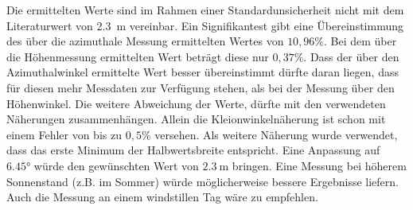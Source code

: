 \documentclass[../../main.tex]{subfiles}
\begin{document}
    Die ermittelten Werte sind im Rahmen einer Standardunsicherheit nicht mit dem Literaturwert von \SI{2,3}{\metre} \cite{doc:SalsaManual} vereinbar. Ein Signifikantest gibt eine Übereinstimmung des über die azimuthale Messung ermittelten Wertes von $10,96\%$. Bei dem über die Höhenmessung ermittelten Wert beträgt diese nur $0,37\%$. Dass der über den Azimuthalwinkel ermittelte Wert besser übereinstimmt dürfte daran liegen, dass für diesen mehr Messdaten zur Verfügung stehen, als bei der Messung über den Höhenwinkel. Die weitere Abweichung der Werte, dürfte mit den verwendeten Näherungen zusammenhängen. Allein die Kleionwinkelnäherung ist schon mit einem Fehler von bis zu $0,5\%$ versehen. Als weitere Näherung wurde verwendet, dass das erste Minimum der Halbwertsbreite entspricht. Eine Anpassung auf $\ang{6,45}$ würde den gewünschten Wert von $\SI{2,3}{\metre}$ bringen. Eine Messung bei höherem Sonnenstand (z.B. im Sommer) würde möglicherweise bessere Ergebnisse liefern. Auch die Messung an einem windstillen Tag wäre zu empfehlen.
\end{document}
